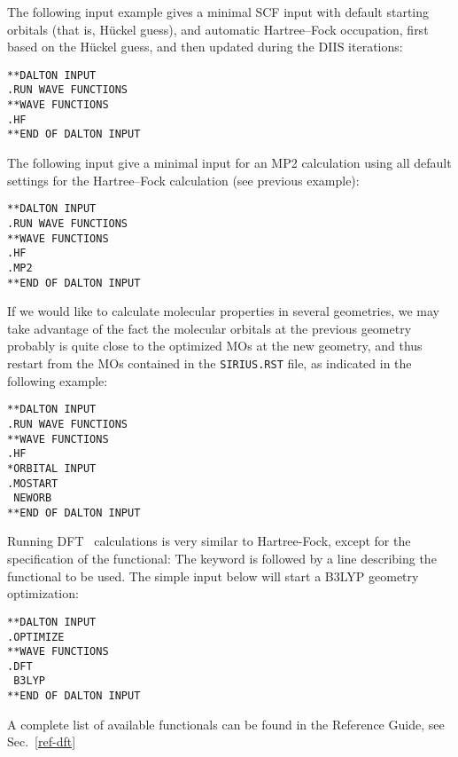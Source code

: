 \bigskip

The following input example gives a minimal
SCF input with default
starting  orbitals (that is, H\"{u}ckel guess), and automatic Hartree--Fock
occupation, first based on the H\"{u}ckel guess, and
then updated during the DIIS iterations:

\begin{verbatim}
**DALTON INPUT
.RUN WAVE FUNCTIONS
**WAVE FUNCTIONS
.HF
**END OF DALTON INPUT
\end{verbatim}
\label{sirius_ex1a}

The following input give a minimal input for an
MP2
calculation using all default settings for the Hartree--Fock
calculation (see previous example):

\begin{verbatim}
**DALTON INPUT
.RUN WAVE FUNCTIONS
**WAVE FUNCTIONS
.HF
.MP2
**END OF DALTON INPUT
\end{verbatim}
\label{sirius_ex1b}

If we would like to calculate molecular properties in several
geometries, we may take advantage of the fact the molecular
orbitals at the previous geometry probably is quite close to the
optimized MOs at the new geometry, and thus restart
from the MOs contained in the \verb|SIRIUS.RST|
file, as indicated in the following example:

\begin{verbatim}
**DALTON INPUT
.RUN WAVE FUNCTIONS
**WAVE FUNCTIONS
.HF
*ORBITAL INPUT
.MOSTART
 NEWORB
**END OF DALTON INPUT
\end{verbatim}
\label{sirius_ex2}

Running DFT~ calculations is very similar to Hartree-Fock, except for
the specification of the functional: The  keyword is followed by a
line describing the functional to be used. The simple input below will
start a B3LYP geometry optimization:
\begin{verbatim}
**DALTON INPUT
.OPTIMIZE
**WAVE FUNCTIONS
.DFT
 B3LYP
**END OF DALTON INPUT
\end{verbatim}
A complete list of available functionals can be found in the Reference Guide, see Sec.~\ref{ref-dft}

